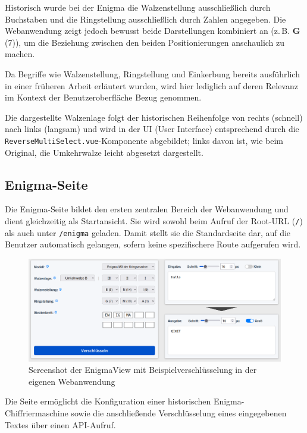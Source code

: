 \documentclass[12pt, ngerman, a4paper, numbers=noenddot]{article}
\begin{document}
Historisch wurde bei der Enigma die Walzenstellung ausschließlich durch Buchstaben und die Ringstellung ausschließlich durch Zahlen angegeben. Die Webanwendung zeigt jedoch bewusst beide Darstellungen kombiniert an (z.\,B. \textbf{G} (7)), um die Beziehung zwischen den beiden Positionierungen anschaulich zu machen. 


Da Begriffe wie Walzenstellung, Ringstellung und Einkerbung bereits ausführlich in einer früheren Arbeit erläutert wurden, wird hier lediglich auf deren Relevanz im Kontext der Benutzeroberfläche Bezug genommen.

Die dargestellte Walzenlage folgt der historischen Reihenfolge von rechts (schnell) nach links (langsam) und wird in der UI (User Interface) entsprechend durch die \lstinline|ReverseMultiSelect.vue|-Komponente abgebildet; links davon ist, wie beim Original, die Umkehrwalze leicht abgesetzt dargestellt.



\subsection{Enigma-Seite}


Die Enigma-Seite bildet den ersten zentralen Bereich der Webanwendung und dient gleichzeitig als Startansicht. Sie wird sowohl beim Aufruf der Root-URL (\lstinline|/|) als auch unter \lstinline|/enigma| geladen. Damit stellt sie die Standardseite dar, auf die Benutzer automatisch gelangen, sofern keine spezifischere Route aufgerufen wird.

\begin{figure}[H]
	\centering
	\includegraphics[width=1\textwidth]{bilder/EnigmaView.png}
	\caption{Screenshot der EnigmaView mit Beispielverschlüsselung in der eigenen Webanwendung}
	\label{fig:EnigmaView}
\end{figure}

Die Seite ermöglicht die Konfiguration einer historischen Enigma-Chiffrier\-maschine sowie die anschließende Verschlüsselung eines eingegebenen Textes über einen API-Aufruf.
\end{document}
